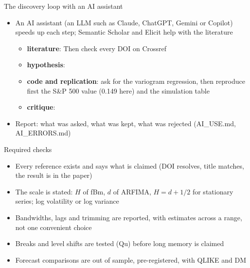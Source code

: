 \begin{frame}{The discovery loop with an AI assistant}
\itemsize{\footnotesize}
\begin{itemize}
    \item An AI assistant (an LLM such as Claude, ChatGPT, Gemini or Copilot) speeds up each step; Semantic Scholar and Elicit help with the literature
    \begin{itemize}
        \item \textbf{literature}:  Then check every DOI on Crossref
        \item \textbf{hypothesis}: 
        \item \textbf{code and replication}: ask for the variogram regression, then reproduce first the S\&P 500 value (0.149 here) and the simulation table
        \item \textbf{critique}: 
    \end{itemize}
    \item Report: what was asked, what was kept, what was rejected (AI\_USE.md, AI\_ERRORS.md)
\end{itemize}
\end{frame}

\begin{frame}{Required checks}
\itemsize{\small}
\begin{itemize}
    \item Every reference exists and says what is claimed (DOI resolves, title matches, the result is in the paper)
    \item The scale is stated: $H$ of fBm, $d$ of ARFIMA, $H = d + 1/2$ for stationary series; log volatility or log variance
    \item Bandwidths, lags and trimming are reported, with estimates across a range, not one convenient choice
    \item Breaks and level shifts are tested (Qu) before long memory is claimed
    \item Forecast comparisons are out of sample, pre-registered, with QLIKE and DM
\end{itemize}
\end{frame}

